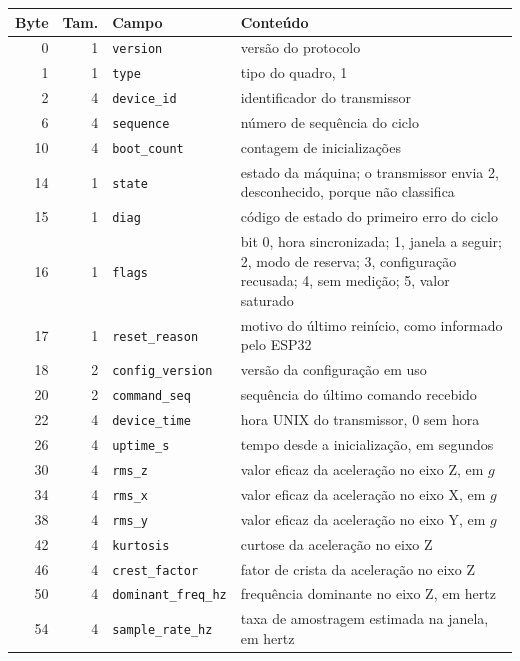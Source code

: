 \begin{quadro}[!htbp]
\centering\small
\caption{Campos da telemetria, de 71 bytes}\label{tab:ap-telemetria}
\begin{tabular}{@{}rr>{\raggedright\arraybackslash}p{38mm}>{\raggedright\arraybackslash}p{78mm}@{}}
\toprule
Byte & Tam. & Campo & Conteúdo \\
\midrule
0 & 1 & \texttt{version} & versão do protocolo \\
1 & 1 & \texttt{type} & tipo do quadro, 1 \\
2 & 4 & \texttt{device\_id} & identificador do transmissor \\
6 & 4 & \texttt{sequence} & número de sequência do ciclo \\
10 & 4 & \texttt{boot\_count} & contagem de inicializações \\
14 & 1 & \texttt{state} & estado da máquina; o transmissor envia 2, desconhecido, porque não classifica \\
15 & 1 & \texttt{diag} & código de estado do primeiro erro do ciclo \\
16 & 1 & \texttt{flags} & bit 0, hora sincronizada; 1, janela a seguir; 2, modo de reserva; 3, configuração recusada; 4, sem medição; 5, valor saturado \\
17 & 1 & \texttt{reset\_reason} & motivo do último reinício, como informado pelo ESP32 \\
18 & 2 & \texttt{config\_version} & versão da configuração em uso \\
20 & 2 & \texttt{command\_seq} & sequência do último comando recebido \\
22 & 4 & \texttt{device\_time} & hora UNIX do transmissor, 0 sem hora \\
26 & 4 & \texttt{uptime\_s} & tempo desde a inicialização, em segundos \\
30 & 4 & \texttt{rms\_z} & valor eficaz da aceleração no eixo Z, em $g$ \\
34 & 4 & \texttt{rms\_x} & valor eficaz da aceleração no eixo X, em $g$ \\
38 & 4 & \texttt{rms\_y} & valor eficaz da aceleração no eixo Y, em $g$ \\
42 & 4 & \texttt{kurtosis} & curtose da aceleração no eixo Z \\
46 & 4 & \texttt{crest\_factor} & fator de crista da aceleração no eixo Z \\
50 & 4 & \texttt{dominant\_freq\_hz} & frequência dominante no eixo Z, em hertz \\
54 & 4 & \texttt{sample\_rate\_hz} & taxa de amostragem estimada na janela, em hertz \\

\end{tabular}
\end{quadro}
